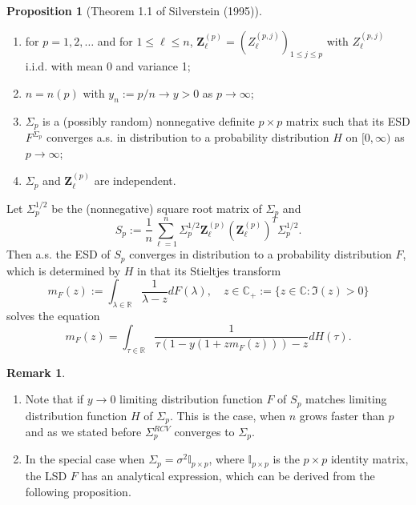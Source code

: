 \documentclass[a4paper,11pt]{article}
\theoremstyle{plain}
\theoremstyle{definition}
\newtheorem{rmrk}[thm]{Remark}
\newtheorem{prps}[thm]{Proposition}
\newcommand{\MR}{\mathbb{R}}
\begin{document}
	\begin{prps} [Theorem 1.1 of Silverstein (1995)] \label{MP law} \
		\begin{enumerate}
			\item for $p = 1, 2, \dots$ and for $1 \leq \ell \leq n$, $\mathbf{Z}_\ell^{(p)} = (Z_\ell^{(p,j)})_{1 \leq j \leq p}$ with $Z_\ell^{(p,j)}$ i.i.d. with mean 0 and variance 1;
			\item $n = n(p)$ with $y_n := p/n \rightarrow y > 0$ as $p \rightarrow \infty$;
			\item $\Sigma_p$ is a (possibly random) nonnegative definite $p \times p$ matrix such that its ESD $F^{\Sigma_p}$ converges a.s. in distribution to a probability distribution $H$ on $[0,\infty)$ as $p \rightarrow \infty$;
			\item $\Sigma_p$ and $\mathbf{Z}_\ell^{(p)}$ are independent.
		\end{enumerate}
		Let $\Sigma_p^{1/2}$ be the (nonnegative) square root matrix of $\Sigma_p$ and 
		\[S_p:= \frac{1}{n} \sum_{\ell=1}^{n} \Sigma_p^{1/2} \mathbf{Z}_\ell^{(p)}(\mathbf{Z}_\ell^{(p)})^T \Sigma_p^{1/2}.\]
		Then a.s. the ESD of $S_p$ converges in distribution to a probability distribution $F$, which is determined by $H$ in that its Stieltjes transform
		\[ m_F(z):=\int_{\lambda \in \MR} \frac{1}{\lambda - z} dF(\lambda), \quad z \in \mathbb{C}_+ := \{ z \in \mathbb{C} : \Im(z)>0 \} \]
		solves the equation
		\begin{equation}
		m_F(z) = \int_{\tau \in \MR} \frac{1}{\tau (1-y(1+zm_F(z))) - z } dH(\tau).
		\end{equation}
	\end{prps}
	
	\begin{rmrk} \
		\begin{enumerate}
			\item Note that if $y \rightarrow 0$ limiting distribution function $F$ of $S_p$ matches limiting distribution function $H$ of $\Sigma_p$. This is the case, when $n$ grows faster than $p$ and as we stated before $\Sigma_p^{RCV}$ converges to $\Sigma_p$. 
			\item In the special case when $\Sigma_p = \sigma^2 \mathbb{I}_{p \times p}$, where $\mathbb{I}_{p \times p}$ is the $p \times p$ identity matrix, the LSD $F$ has an analytical expression, which can be derived from the following proposition.
		\end{enumerate}
	\end{rmrk}
	
\end{document}
